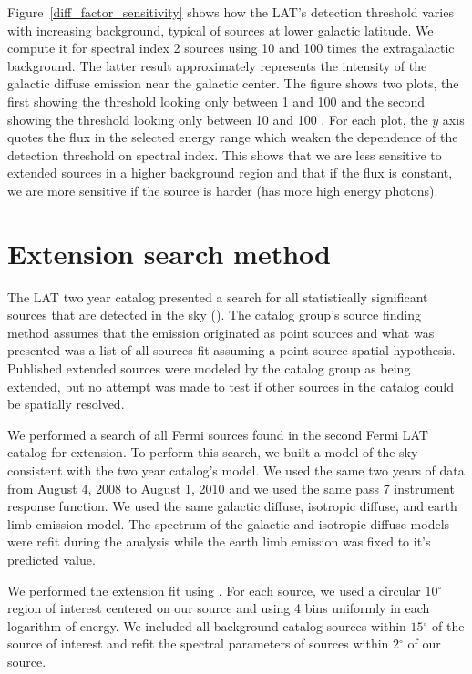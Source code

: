 \documentclass[12pt,preprint]{aastex}
\newcommand{\gev}{\text{GeV}\xspace}
\renewcommand{\deg}{\ensuremath{^\circ}\xspace}
\newcommand{\pointlike}{\text{\em pointlike}\xspace}
\begin{document}
Figure~\ref{diff_factor_sensitivity} shows how the LAT's
detection threshold varies with increasing background, typical of sources
at lower galactic latitude. We compute it for spectral
index 2 sources using 10 and 100 times the
extragalactic background. The latter result approximately represents the intensity of
the galactic diffuse emission near the galactic center. 
The figure shows two plots, the first showing the threshold looking only between 
1 \gev and 100 \gev and the second showing the threshold looking only
between 10 \gev and 100 \gev.
For each plot, the $y$ axis quotes the flux in the selected energy range
which weaken the dependence of the detection threshold on spectral index.
This shows that we are less sensitive to extended sources in
a higher background region and that if the flux is constant,
we are more sensitive if the source is harder (has more high energy
photons).

\section{Extension search method}

The LAT two year catalog presented a search for all
statistically significant sources that are detected in the \gev
sky (\cite{second_cat}).  The catalog group's source finding method assumes
that the emission originated as point sources and what was presented was
a list of all sources fit assuming a point source spatial hypothesis. 
Published extended sources were modeled by the catalog group as 
being extended, but no attempt was made to test if other sources in the catalog
could be spatially resolved.

We performed a search of all Fermi sources found in the second Fermi LAT
catalog for extension.  To perform this search, we built a model of the
sky consistent with the two year catalog's model.   We used the same two
years of data from August 4, 2008 to August 1, 2010 and we used the same
pass 7 instrument response function.  We used the same galactic diffuse,
isotropic diffuse, and earth limb emission model. The spectrum of the
galactic and isotropic diffuse models were refit during the analysis
while the earth limb emission was fixed to it's predicted value.

We performed the extension fit using \pointlike.  For each source, we
used a circular $10\deg$ region of interest centered on our source and
using 4 bins uniformly in each logarithm of energy.  We included all
background catalog sources within $15\deg$ of the source of interest
and refit the spectral parameters of sources within $2\deg$ of our source.
\end{document}
